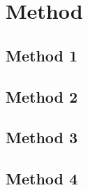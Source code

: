 \documentclass[../main.tex]{subfiles}
\begin{document}
    \chapter{Method}
    \lipsum[1]
    
    \section{Method 1}
    \lipsum[1]
    
    \section{Method 2}
    \lipsum[1]
    
    \section{Method 3}
    \lipsum[1]

    \section{Method 4}\label{case_study_chapter}
    \lipsum[1]
    
\biblio
\cleardoublepage
\end{document}
